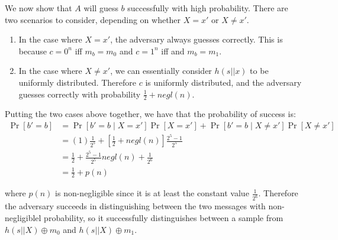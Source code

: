 \documentclass{article}
\begin{document}
\begin{enumerate}[,start=4]
\begin{enumerate}[,label=\alph*.]
We now show that $A$ will guess $b$ successfully with high probability. There are two 
scenarios to consider, depending on whether $X = x'$ or $X \neq x'$.%

\begin{enumerate}[noitemsep,topsep=\mdcompacttopsep]%

\item{}In the case where $X = x'$, the adversary always guesses correctly. This is because
$c = 0^n$ iff $m_b = m_0$ and $c = 1^n$ iff and $m_b = m_1$.%

\item{}In the case where $X \neq x'$, we can essentially consider $h(s || x)$ to be uniformly
distributed. Therefore $c$ is uniformly distributed, and the adversary guesses 
correctly with probability $\frac{1}{2} + negl(n)$.%
\end{enumerate}%

Putting the two cases above together, we have that the probability of success is:%
\noindent\noindent\[%
\begin{aligned}
\Pr[b' = b] &= \Pr[b' = b \mid X = x']\Pr[X = x'] + \Pr[b' = b \mid X \neq x']\Pr[X \neq x'] \\
&= (1)\frac{1}{2^5} + [\frac{1}{2} + negl(n)]\frac{2^5 - 1}{2^5} \\
&= \frac{1}{2} + \frac{2^5 - 1}{2^5}negl(n) + \frac{1}{2^6} \\
&= \frac{1}{2} + p(n)
\end{aligned}
\]%

where $p(n)$ is non-negligible since it is at least the constant value $\frac{1}{2^6}$. Therefore
the adversary succeeds in distinguishing between the two messages with non-negligiblel 
probability, so it successfully distinguishes between a sample from $h(s|| X) \oplus m_0$ and
$h(s || X) \oplus m_1$.    %
\end{enumerate}%
\end{enumerate}%
\end{document}
